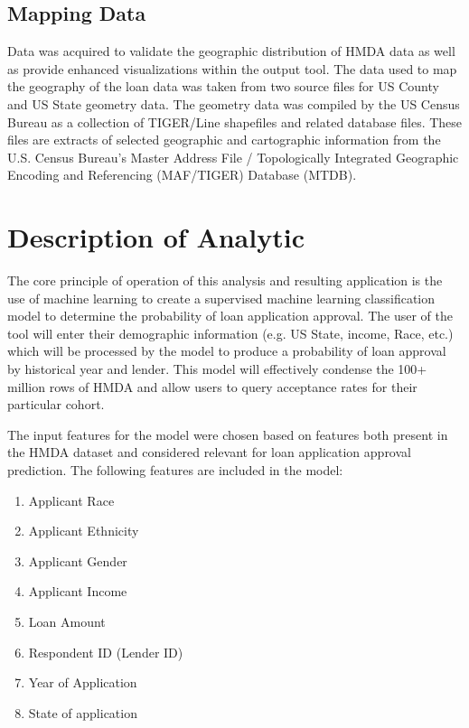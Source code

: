 \documentclass[conference,compsoc]{IEEEtran}
\begin{document}
\subsection{Mapping Data}

Data was acquired to validate the geographic distribution of HMDA data as well as provide enhanced visualizations within the output tool. The data used to map the geography of the loan data was taken from two source files for US County \cite{USCensusOne} and US State \cite{USCensusTwo} geometry data. The geometry data was compiled by the US Census Bureau as a collection of TIGER/Line shapefiles and related database files. These files are extracts of selected geographic and cartographic information from the U.S. Census Bureau's Master Address File / Topologically Integrated Geographic Encoding and Referencing (MAF/TIGER) Database (MTDB). 


\section{Description of Analytic}

The core principle of operation of this analysis and resulting application is the use of machine learning to create a supervised machine learning classification model to determine the probability of loan application approval. The user of the tool will enter their demographic information (e.g. US State, income, Race, etc.) which will be processed by the model to produce a probability of loan approval by historical year and lender. This model will effectively condense the 100+ million rows of HMDA and allow users to query acceptance rates for their particular cohort. 


    The input features for the model were chosen based on features both present in the HMDA dataset and considered relevant for loan application approval prediction. The following features are included in the model:


\begin{enumerate}
\item Applicant Race
\item Applicant Ethnicity
\item Applicant Gender
\item Applicant Income
\item Loan Amount
\item Respondent ID (Lender ID)
\item Year of Application
\item State of application


\end{enumerate}
\end{document}
